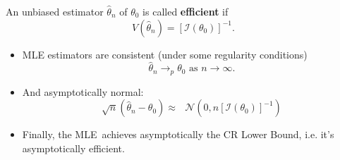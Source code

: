 \documentclass[notes=show]{beamer}
\begin{document}
\begin{frame}%


\begin{definition}
An unbiased estimator $\hat{\theta}_{n}$ of $\theta _{0}$ is called \textbf{%
efficient} if 
\begin{equation*}
V\left( \hat{\theta}_{n}\right) =\left[ \mathcal{I}\left( \theta _{0}\right) %
\right] ^{-1}.
\end{equation*}
\end{definition}

\begin{itemize}
\item MLE estimators are consistent (under some regularity conditions) 
\begin{equation*}
\hat{\theta}_{n}\rightarrow _{p}\theta _{0}\text{ \ as \ }n\rightarrow
\infty .
\end{equation*}

\item And asymptotically normal:%
\begin{equation*}
\sqrt{n}(\hat{\theta}_{n}-\theta _{0})\!\approx \text{\ }\mathcal{N}\left(
0,n\left[ \mathcal{I}\left( \theta _{0}\right) \right] ^{-1}\right)
\end{equation*}

\item Finally, the MLE\ achieves asymptotically the CR Lower Bound, i.e.
it's asymptotically efficient.
\end{itemize}

\end{frame}%
\end{document}
